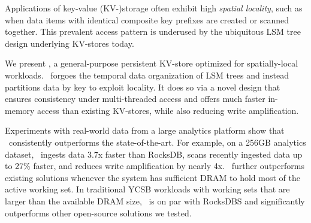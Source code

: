 Applications of key-value (KV-)storage often exhibit high \emph{spatial locality}, such as  
when data items with identical composite key prefixes are created or scanned together.  
This prevalent access pattern is underused by the ubiquitous LSM tree design underlying 
KV-stores today.

We present \sys, a general-purpose persistent KV-store optimized for spatially-local workloads. 
\sys\ forgoes the temporal data organization of LSM trees and instead partitions data by key to exploit locality. 
It does so via a novel design that ensures consistency under multi-threaded access and 
offers much faster in-memory access than existing KV-stores,
while also reducing write amplification. 

Experiments with real-world data from a large analytics platform show that \sys\  
consistently outperforms the state-of-the-art. For example, on a 256GB analytics dataset, 
\sys\ ingests data 3.7x faster than RocksDB,  scans recently ingested data up to 27\% faster, 
and reduces write amplification by nearly 4x. 
\sys\ further outperforms existing solutions whenever 
the system has sufficient DRAM to hold most of the active working set. 
In traditional YCSB workloads with working sets that are larger than the available DRAM size, 
\sys\ is on par with RocksDBS and significantly outperforms other open-source solutions we tested.
